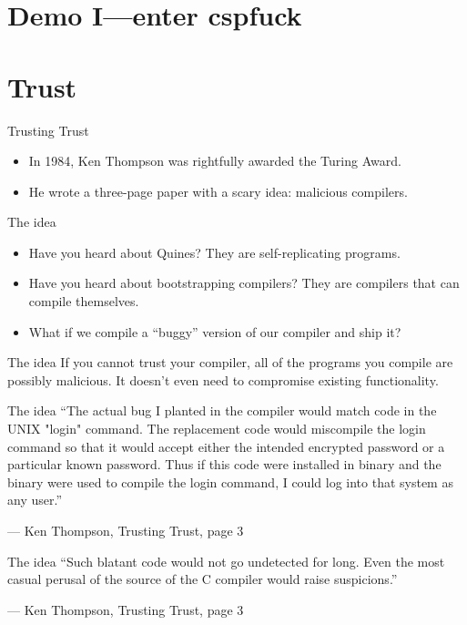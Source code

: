 \documentclass[aspectratio=169]{beamer}
\begin{document}
  \section{Demo I—enter cspfuck}
  \section{Trust}
  \begin{frame}{Trusting Trust}
    \begin{itemize}
      \item In 1984, Ken Thompson was rightfully awarded the Turing Award.
      \item He wrote a three-page paper with a scary idea: malicious compilers.
    \end{itemize}
  \end{frame}
  \begin{frame}{The idea}
    \begin{itemize}
      \item Have you heard about Quines? They are self-replicating programs.
      \item Have you heard about bootstrapping compilers? They are compilers
            that can compile themselves.
      \item What if we compile a “buggy” version of our compiler and ship it?
    \end{itemize}
  \end{frame}
  \begin{frame}{The idea}
    If you cannot trust your compiler, all of the programs you compile are
    possibly malicious. It doesn’t even need to compromise existing
    functionality.
  \end{frame}
  \begin{frame}{The idea}
    “The actual bug I planted in the compiler would match code in the UNIX
     "login" command.  The replacement code would miscompile the login
     command so that it would accept either the intended encrypted password
     or a particular known password. Thus if this code were installed in
     binary and the binary were used to compile the login command, I could
     log into that system as any user.”

     \indent — Ken Thompson, Trusting Trust, page 3
  \end{frame}
  \begin{frame}{The idea}
    “Such blatant code would not go undetected for long. Even the most casual
     perusal of the source of the C compiler would raise suspicions.” 

     \indent — Ken Thompson, Trusting Trust, page 3
  \end{frame}
\end{document}
